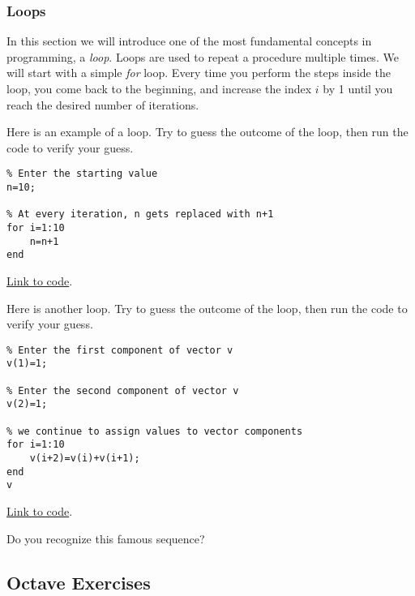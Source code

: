 \documentclass{ximera}
\begin{document}
\subsubsection*{Loops}
In this section we will introduce one of the most fundamental concepts in programming, a \emph{loop}.  Loops are used to repeat a procedure multiple times.  We will start with a simple \emph{for} loop.  Every time you perform the steps inside the loop, you come back to the beginning, and increase the index $i$ by 1 until you reach the desired number of iterations.  

\begin{example}\label{ex:loop1}
Here is an example of a loop.  Try to guess the outcome of the loop, then run the code to verify your guess.

        \begin{verbatim}
% Enter the starting value
n=10;

% At every iteration, n gets replaced with n+1
for i=1:10
    n=n+1
end
    \end{verbatim}

\href{https://sagecell.sagemath.org/?z=eJwdyjEOglAQRdF-ktnDa6iw4LeSX1i4kB95wiRkMMOIcfcSb3lyO9w9GciF2LNFms842vqmitcyjCoqHW4JHowv7Jxb2uYXOGbmjuBrbQ9O-Fgu8L6oPLeA1XItgwrOvP6ZPv0AoF8hKw==&lang=octave&interacts=eJyLjgUAARUAuQ==}{Link to code}.    
\end{example}

\begin{example}\label{ex:loop2}
    Here is another loop.  Try to guess the outcome of the loop, then run the code to verify your guess.

    \begin{verbatim}
% Enter the first component of vector v
v(1)=1;

% Enter the second component of vector v
v(2)=1;

% we continue to assign values to vector components
for i=1:10
    v(i+2)=v(i)+v(i+1);
end
v
    \end{verbatim}

\href{https://sagecell.sagemath.org/?z=eJx9jsEKwkAMRO-C_zCXQpdeXI9Kj35IWVNd0EQ26fr7ZouIXgyBDCFvJh1ObFRgV8KcixqS3B_CxAaZUSmZFFRgu6l9DGM8NundfYFKSfj8j9z_kE_yW7bMC8EEk2q-MOp0W0jb4s1-_LSRs2_yGA9xt_p41T4PbuwjDE3HsEaQv9JCX9KTQAQ=&lang=octave&interacts=eJyLjgUAARUAuQ==}{Link to code}.   

Do you recognize this famous sequence?
\end{example}

\subsection*{Octave Exercises}
\end{document}
